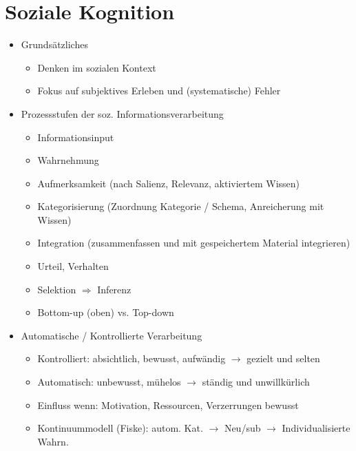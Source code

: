 \documentclass[11pt, paper=a4, twocolumn]{scrartcl}
\begin{document}
	\section{Soziale Kognition}
		\begin{itemize}
			\item Grundsätzliches
				\begin{itemize}
					\item Denken im sozialen Kontext
					\item Fokus auf subjektives Erleben und (systematische) Fehler
				\end{itemize}
			\item Prozessstufen der soz. Informationsverarbeitung
				\begin{itemize}
					\item Informationsinput
					\item Wahrnehmung
					\item Aufmerksamkeit (nach Salienz, Relevanz, aktiviertem Wissen)
					\item Kategorisierung (Zuordnung Kategorie / Schema, Anreicherung mit Wissen)
					\item Integration (zusammenfassen und mit gespeichertem Material integrieren)
					\item Urteil, Verhalten
					\item Selektion $\Rightarrow$ Inferenz
					\item Bottom-up (oben) vs. Top-down
				\end{itemize}

			\item Automatische / Kontrollierte Verarbeitung
				\begin{itemize}
					\item Kontrolliert: absichtlich, bewusst, aufwändig $\rightarrow$ gezielt und selten
					\item Automatisch: unbewusst, mühelos $\rightarrow$ ständig und unwillkürlich
					\item Einfluss wenn: Motivation, Ressourcen, Verzerrungen bewusst
					\item Kontinuummodell (Fiske): autom. Kat. $\rightarrow$ Neu/sub $\rightarrow$ Individualisierte Wahrn.
				\end{itemize}


\end{itemize}
\end{document}
